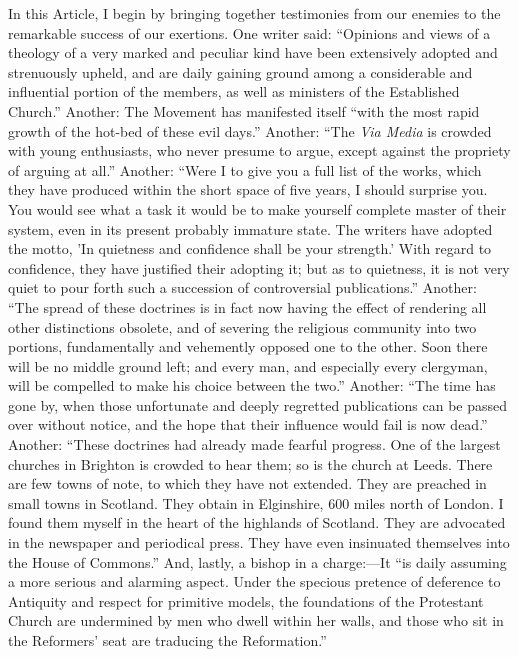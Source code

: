 In this Article, I begin by bringing together testimonies from our
enemies to the remarkable success of our exertions. One writer said:
``Opinions and views of a theology of a very marked and
peculiar kind have been extensively adopted and strenuously upheld, and
are daily gaining ground among a considerable and influential portion of
the members, as well as ministers of the Established Church.''
Another: The Movement has manifested itself ``with the most rapid
growth of the hot-bed of these evil days.'' Another: ``The \emph{Via
Media} is crowded with young enthusiasts, who never presume to argue,
except against the propriety of arguing at all.'' Another:
``Were I to give you a full list of the works, which they have
produced within the short space of five years, I should surprise you.
You would see what a task it would be to make yourself complete master
of their system, even in its present probably immature state. The
writers have adopted the motto, 'In quietness and confidence shall be
your strength.' With regard to confidence, they have justified their
adopting it; but as to quietness, it is not very quiet to pour forth
such a succession of controversial publications.'' Another:
``The spread of these doctrines is in fact now having the effect of
rendering all other distinctions obsolete, and of severing the religious
community into two portions, fundamentally and vehemently opposed one to
the other. Soon there will be no middle ground left; and every man, and
especially every clergyman, will be compelled to make his choice between
the two.'' Another: ``The time has gone by, when those
unfortunate and deeply regretted publications can be passed over without
notice, and the hope that their influence would fail is now dead.''
Another: ``These doctrines had already made fearful progress. One of
the largest churches in Brighton is crowded to hear them; so is the
church at Leeds. There are few towns of note, to which they have not
extended. They are preached in small towns in Scotland. They obtain in
Elginshire, 600 miles north of London. I found them myself in the heart
of the highlands of Scotland. They are advocated in the newspaper and
periodical press. They have even insinuated themselves into the House of
Commons.'' And, lastly, a bishop in a charge:—It ``is daily
assuming a more serious and alarming aspect. Under the specious pretence
of deference to Antiquity and respect for primitive models, the
foundations of the Protestant Church are undermined by men who
dwell within her walls, and those who sit in the Reformers' seat are
traducing the Reformation.''

